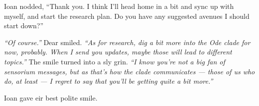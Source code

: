 Ioan nodded, ``Thank you. I think I'll head home in a bit and sync up with myself, and start the research plan. Do you have any suggested avenues I should start down?''

\emph{``Of course.''} Dear smiled. \emph{``As for research, dig a bit more into the Ode clade for now, probably. When I send you updates, maybe those will lead to different topics.''} The smile turned into a sly grin. \emph{``I know you're not a big fan of sensorium messages, but as that's how the clade communicates — those of us who do, at least — I regret to say that you'll be getting quite a bit more.''}

Ioan gave eir best polite smile.
